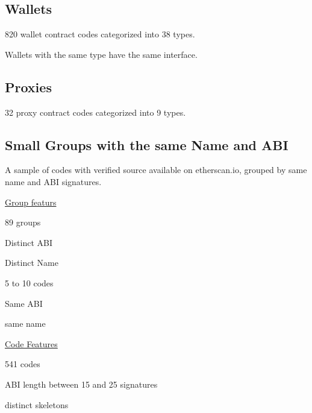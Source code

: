 \documentclass[../main.tex]{subfiles}
\begin{document}
\subsection{Wallets}
820 wallet contract codes categorized into 38 types.

Wallets with the same type have the same interface.


\subsection{Proxies}
32 proxy contract codes categorized into 9 types.


\subsection{Small Groups with the same Name and ABI}
A sample of codes with verified source available on etherscan.io, grouped by same name and ABI signatures.

\underline{Group featurs}
\begin{ul}
 \item 89 groups
 \item Distinct ABI
 \item Distinct Name
 \item 5 to 10 codes
 \begin{ul}
    \item Same ABI
    \item same name
  \end{ul}
\end{ul}

\underline{Code Features}
\begin{ul}
  \item 541 codes
  \item ABI length between 15 and 25 signatures
  \item distinct skeletons
\end{ul}
\end{document}
